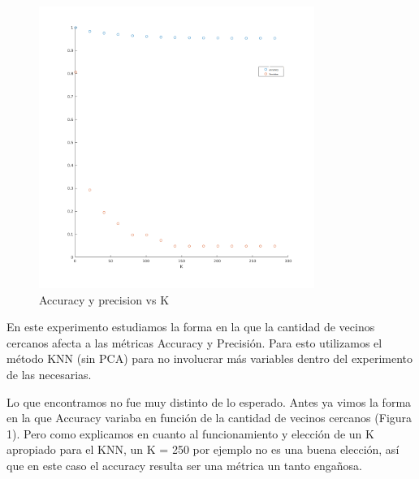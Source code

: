 
\begin{figure}[H]
	\centering	
	\includegraphics[width=0.8\textwidth]{img/acu_pre.png}
	\caption{Accuracy y precision vs K}
	\label{fig: Accuracy y precision vs K con KNN}
\end{figure}

En este experimento estudiamos la forma en la que la cantidad de vecinos cercanos afecta a las métricas Accuracy y Precisión. Para esto utilizamos el método KNN (sin PCA) para no involucrar más variables dentro del experimento de las necesarias.

Lo que encontramos no fue muy distinto de lo esperado. Antes ya vimos la forma en la que Accuracy variaba en función de la cantidad de vecinos cercanos (Figura 1). Pero como explicamos en cuanto al funcionamiento y elección de un K apropiado para el KNN, un K = 250 por ejemplo no es una buena elección, así que en este caso el accuracy resulta ser una métrica un tanto engañosa.

